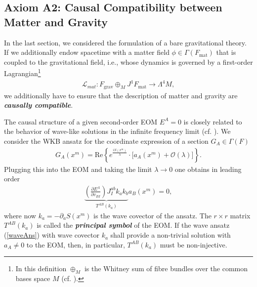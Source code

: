\documentclass[%
preprint,
titlepage,
nofootinbib,
amsmath,amssymb,
showkeys,
aps,
prd,
floatfix,
]{revtex4-2}
\begin{document}
\subsection{Axiom A2: Causal Compatibility between Matter and Gravity}

In the last section, we considered the formulation of a bare gravitational theory. If we additionally endow spacetime with a matter field $\phi \in  \Gamma(F_{\text{mat}})$ that is coupled to the gravitational field, i.e., whose dynamics is governed by a first-order Lagrangian\footnote{In this definition $\oplus_M$ is the Whitney sum of fibre bundles over the common bases space $M$ (cf. \cite{nla.cat-vn705150}).}
\begin{align}\label{matterL}
    \mathcal{L}_{mat} : F_\text{grav} \oplus_M J^1F_\text{mat} \longrightarrow \Lambda^4M,
\end{align}
we additionally have to ensure that the description of matter and gravity are \textit{\textbf{causally compatible}}.

The causal structure of a given second-order EOM $E^A=0$ is closely related to the behavior of wave-like solutions in the infinite frequency limit (cf. \cite{2018PhRvD..97h4036D}). We consider the WKB ansatz for the coordinate expression of a section $G_A \in \Gamma(F)$
\begin{align}\label{waveAns}
    G_A(x^m) = \mathrm{Re}\left \{ e^{\frac{iS(x^m)}{\lambda}} \cdot   \bigl [ a_A(x^m) + \mathcal{O}(\lambda) \bigr ]\right \}.
\end{align}
Plugging this into the EOM and taking the limit $\lambda \rightarrow 0$ one obtains in leading order
\begin{align}
    \underbrace{\left ( \frac{\partial E^A }{\partial v_{BI}} \right ) J_{I}^{ab} k_a k_b}_{T^{AB}(k_a)} a_B(x^m) = 0,
\end{align}
where now $k_a = - \partial_aS(x^m)$ is the wave covector of the ansatz. The $r\times r$ matrix $T^{AB}(k_a)$ is called the \textit{\textbf{principal symbol}} of the EOM. If the wave ansatz (\ref{waveAns}) with wave covector $k_a$ shall provide a non-trivial solution with $a_A \neq 0$ to the EOM, then, in particular,  $T^{AB}(k_a)$ must be non-injective. 
\end{document}
